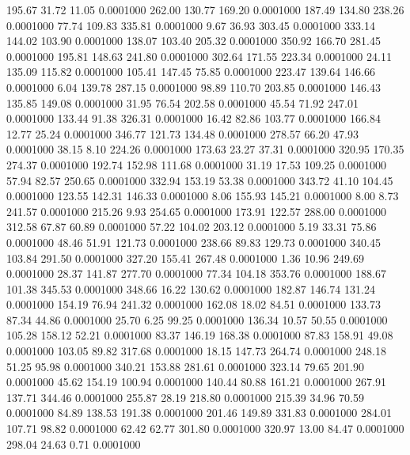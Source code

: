  195.67   31.72   11.05   0.0001000
 262.00  130.77  169.20   0.0001000
 187.49  134.80  238.26   0.0001000
  77.74  109.83  335.81   0.0001000
   9.67   36.93  303.45   0.0001000
 333.14  144.02  103.90   0.0001000
 138.07  103.40  205.32   0.0001000
 350.92  166.70  281.45   0.0001000
 195.81  148.63  241.80   0.0001000
 302.64  171.55  223.34   0.0001000
  24.11  135.09  115.82   0.0001000
 105.41  147.45   75.85   0.0001000
 223.47  139.64  146.66   0.0001000
   6.04  139.78  287.15   0.0001000
  98.89  110.70  203.85   0.0001000
 146.43  135.85  149.08   0.0001000
  31.95   76.54  202.58   0.0001000
  45.54   71.92  247.01   0.0001000
 133.44   91.38  326.31   0.0001000
  16.42   82.86  103.77   0.0001000
 166.84   12.77   25.24   0.0001000
 346.77  121.73  134.48   0.0001000
 278.57   66.20   47.93   0.0001000
  38.15    8.10  224.26   0.0001000
 173.63   23.27   37.31   0.0001000
 320.95  170.35  274.37   0.0001000
 192.74  152.98  111.68   0.0001000
  31.19   17.53  109.25   0.0001000
  57.94   82.57  250.65   0.0001000
 332.94  153.19   53.38   0.0001000
 343.72   41.10  104.45   0.0001000
 123.55  142.31  146.33   0.0001000
   8.06  155.93  145.21   0.0001000
   8.00    8.73  241.57   0.0001000
 215.26    9.93  254.65   0.0001000
 173.91  122.57  288.00   0.0001000
 312.58   67.87   60.89   0.0001000
  57.22  104.02  203.12   0.0001000
   5.19   33.31   75.86   0.0001000
  48.46   51.91  121.73   0.0001000
 238.66   89.83  129.73   0.0001000
 340.45  103.84  291.50   0.0001000
 327.20  155.41  267.48   0.0001000
   1.36   10.96  249.69   0.0001000
  28.37  141.87  277.70   0.0001000
  77.34  104.18  353.76   0.0001000
 188.67  101.38  345.53   0.0001000
 348.66   16.22  130.62   0.0001000
 182.87  146.74  131.24   0.0001000
 154.19   76.94  241.32   0.0001000
 162.08   18.02   84.51   0.0001000
 133.73   87.34   44.86   0.0001000
  25.70    6.25   99.25   0.0001000
 136.34   10.57   50.55   0.0001000
 105.28  158.12   52.21   0.0001000
  83.37  146.19  168.38   0.0001000
  87.83  158.91   49.08   0.0001000
 103.05   89.82  317.68   0.0001000
  18.15  147.73  264.74   0.0001000
 248.18   51.25   95.98   0.0001000
 340.21  153.88  281.61   0.0001000
 323.14   79.65  201.90   0.0001000
  45.62  154.19  100.94   0.0001000
 140.44   80.88  161.21   0.0001000
 267.91  137.71  344.46   0.0001000
 255.87   28.19  218.80   0.0001000
 215.39   34.96   70.59   0.0001000
  84.89  138.53  191.38   0.0001000
 201.46  149.89  331.83   0.0001000
 284.01  107.71   98.82   0.0001000
  62.42   62.77  301.80   0.0001000
 320.97   13.00   84.47   0.0001000
 298.04   24.63    0.71   0.0001000
